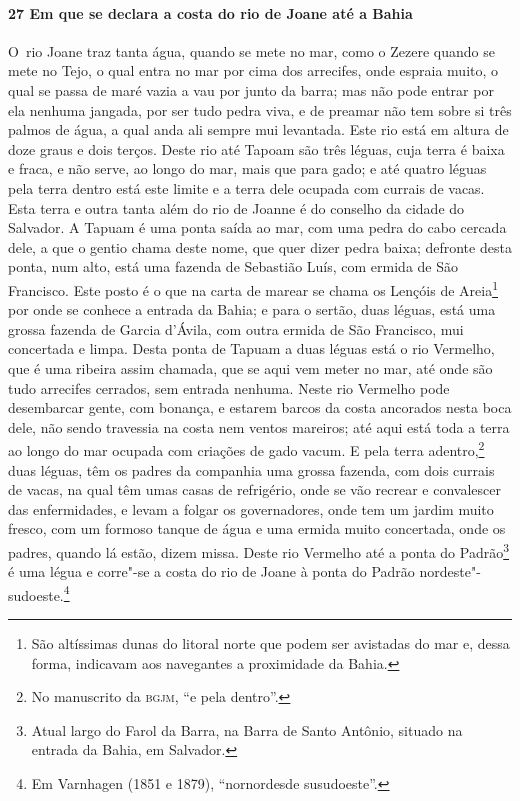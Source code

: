 \begin{linenumbers}
\paragraph{27 Em que se declara a costa do rio de Joane até a Bahia} \quad
\mbox{O rio} Joane traz tanta água, quando se mete no mar, como o Zezere quando se mete no Tejo,
o qual entra no mar por cima dos arrecifes, onde espraia muito, o qual se passa de maré
vazia a vau por junto da barra; mas não pode entrar por ela nenhuma jangada, por ser tudo
pedra viva, e de preamar não tem sobre si três palmos de água, a qual anda ali sempre mui
levantada. Este rio está em altura de doze graus e dois terços. Deste rio até Tapoam são
três léguas, cuja terra é baixa e fraca, e não serve, ao longo do mar, mais que para gado;
e até quatro léguas pela terra dentro está este limite e a terra dele ocupada com currais
de vacas. Esta terra e outra tanta além do rio de Joanne é do conselho da cidade do
Salvador. A Tapuam é uma ponta saída ao mar, com uma pedra do cabo cercada dele, a que o
gentio chama deste nome, que quer dizer pedra baixa; defronte desta ponta, num alto, está
uma fazenda de Sebastião Luís, com ermida de São Francisco. Este posto é o que na carta de
marear se chama os Lençóis de Areia\footnote{ São altíssimas dunas do litoral norte que
podem ser avistadas do mar e, dessa forma, indicavam aos navegantes a proximidade da
Bahia.} por onde se conhece a entrada da Bahia; e para o sertão, duas léguas, está uma
grossa fazenda de Garcia d'Ávila, com outra ermida de São Francisco, mui concertada e
limpa. Desta ponta de Tapuam a duas léguas está o rio Vermelho, que é uma ribeira assim
chamada, que se aqui vem meter no mar, até onde são tudo arrecifes cerrados, sem entrada
nenhuma. Neste rio Vermelho pode desembarcar gente, com bonança, e estarem barcos da costa
ancorados nesta boca dele, não sendo travessia na costa nem ventos mareiros; até aqui está
toda a terra ao longo do mar ocupada com criações de gado vacum. E pela terra
adentro,\footnote{ No manuscrito da \textsc{bgjm}, ``e pela dentro''.} duas léguas, têm os
padres da companhia uma grossa fazenda, com dois currais de vacas, na qual têm umas casas
de refrigério, onde se vão recrear e convalescer das enfermidades, e levam a folgar os
governadores, onde tem um jardim muito fresco, com um formoso tanque de água e uma ermida
muito concertada, onde os padres, quando lá estão, dizem missa. Deste rio Vermelho até a
ponta do Padrão\footnote{ Atual largo do Farol da Barra, na Barra de Santo Antônio,
situado na entrada da Bahia, em Salvador.} é uma légua e corre"-se a costa do rio de Joane
à ponta do Padrão nordeste"-sudoeste.\footnote{ Em Varnhagen (1851 e 1879), ``nornordesde
susudoeste''.}


\end{linenumbers}
